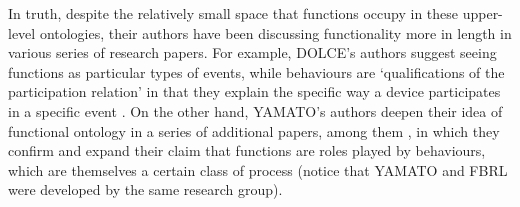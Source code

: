 \documentclass[sw]{iosart2x}
\newcommand{\DOLCE}{\textsc{DOLCE}\xspace} %
\newcommand{\YAMATO}{\textsc{YAMATO}\xspace}
\newcommand{\myComment}[1]{{\unskip \ignorespaces}}
\begin{document}
In truth, despite the relatively small space that functions occupy in these upper-level ontologies, their authors have been discussing functionality more in length in various series of research papers. 
For example, \DOLCE's authors suggest seeing functions as particular types of events, while behaviours are `qualifications of the participation relation' in that they explain the specific way a device participates in a specific event \cite{borgoCapabilitiesCapacitiesFunctionalities2021,borgoFormalizationFunctionsOperations2011, garbaczTwoOntologydrivenFormalisations2011}. %
On the other hand, \YAMATO's authors deepen their idea of functional ontology in a series of additional papers, among them \cite{kitamuraOntologicalModelDevice2006, kitamuraCharacterizingFunctionsBased2013, mizoguchiFunctionalOntologyArtifacts2009,mizoguchiUnifyingDefinitionArtifact2016}, in which they confirm and expand their claim that functions are roles played by behaviours, which are themselves a certain class of process (notice that \YAMATO \myComment{'s authors are same research group behind FBRL development} and FBRL were developed by the same research group).
\end{document}
